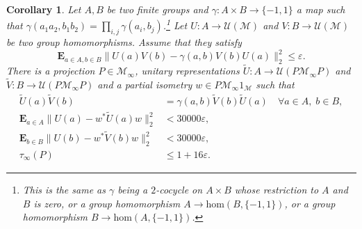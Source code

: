 \documentclass[10pt]{amsart}
\theoremstyle{plain}
\newtheorem{corollary}[theorem]{Corollary}
\theoremstyle{definition}
\newcommand{\cM}{\mathcal{M}}
\newcommand{\E}{\mathbf{E}}
\newcommand{\cU}{\mathcal{U}}
\begin{document}
\begin{corollary}\label{cor:averageGowersHatami_central_ext_products} Let $A,B$ be two finite groups and $\gamma:A\times B \to \{-1,1\}$ a map such that $\gamma(a_1 a_2,b_1b_2) = \prod_{i,j} \gamma(a_i, b_j)$.\footnote{This is the same as $\gamma$ being a $2$-cocycle on $A \times B$ whose restriction to $A$ and $B$ is zero, or a group homomorphism $A \to \mathrm{hom}(B,\{-1,1\})$, or a group homomorphism $B \to \mathrm{hom}(A,\{-1,1\})$.} Let $U:A \to \cU(\cM)$ and $V: B \to \cU(\cM)$ be two group homomorphisms. Assume that they satisfy
\[
\E_{a \in A,b \in B} \|U(a)V(b) - \gamma(a,b) V(b) U(a)\|_2^2 \leq \varepsilon.
\]
There is a projection $P \in \cM_\infty$, unitary representations $\tilde U:A \to \cU(P\cM_\infty P)$ and $\tilde V:B \to \cU(P\cM_\infty P)$ and a partial isometry $w \in P \cM_\infty 1_\cM$ such that
\begin{align*}
\tilde U(a) \tilde V(b) &= \gamma(a,b) \tilde V(b) \tilde U(a)\quad \forall a\in A,\; b \in B,
\\
\E_{a \in A} \|U(a)-w^* \tilde U(a) w\|_2^2&< 30000 \varepsilon,
\\
\E_{b \in B} \|U(b)-w^* \tilde V(b) w\|_2^2&< 30000 \varepsilon,
\\
\tau_\infty(P)&\leq 1+16\varepsilon.
\end{align*}
\end{corollary}
\end{document}
